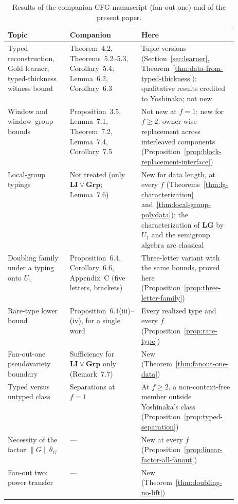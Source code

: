 \begin{table}[htbp]
\caption{Results of the companion CFG manuscript \cite{kuriyamaCFG}
(fan-out one) and of the present paper.}
\label{tab:companion-overlap}
\centering
\footnotesize
\setlength{\tabcolsep}{3pt}
\renewcommand{\arraystretch}{1.15}
\begin{tabularx}{\linewidth}{@{}>{\raggedright\arraybackslash}p{0.27\linewidth}>{\raggedright\arraybackslash}p{0.25\linewidth}>{\raggedright\arraybackslash}X@{}}
\hline
Topic & Companion \cite{kuriyamaCFG} & Here\\
\hline
Typed reconstruction, Gold learner, typed-thickness witness bound
 & Theorem~4.2, Theorems~5.2--5.3, Corollary~5.4; Lemma~6.2, Corollary~6.3
 & Tuple versions (Section~\ref{sec:learner},
   Theorem~\ref{thm:data-from-typed-thickness}); qualitative results credited to
   Yoshinaka; not new\\
Window and window--group bounds
 & Proposition~3.5, Lemma~7.1, Theorem~7.2, Lemma~7.4, Corollary~7.5
 & Not new at $f=1$; new for $f\ge2$: owner-wise replacement across interleaved
   components (Proposition~\ref{prop:block-replacement-interface})\\
Local-group typings
 & Not treated (only $\mathbf{LI}\vee\mathbf{Grp}$; Lemma~7.6)
 & New for data length, at every $f$ (Theorems~\ref{thm:lg-characterization}
   and~\ref{thm:local-group-polydata}); the characterization of $\mathbf{LG}$ by
   $U_1$ and the semigroup algebra are classical \cite{AlmeidaEtAl2009}\\
Doubling family under a typing onto $U_1$
 & Proposition~6.4, Corollary~6.6, Appendix~C (five letters, brackets)
 & Three-letter variant with the same bounds, proved here
   (Proposition~\ref{prop:three-letter-family})\\
Rare-type lower bound
 & Proposition~6.4(iii)--(iv), for a single word
 & Every realized type and every $f$ (Proposition~\ref{prop:rare-type})\\
Fan-out-one pseudovariety boundary
 & Sufficiency for $\mathbf{LI}\vee\mathbf{Grp}$ only (Remark~7.7)
 & New (Theorem~\ref{thm:fanout-one-data})\\
Typed versus untyped class
 & Separations at $f=1$
 & At $f\ge2$, a non-context-free member outside Yoshinaka's class
   (Proposition~\ref{prop:typed-separation})\\
Necessity of the factor $\|G\|\bar\theta_G$
 & ---
 & New at every $f$ (Proposition~\ref{prop:linear-factor-all-fanout})\\
Fan-out two: power transfer
 & ---
 & New (Theorem~\ref{thm:doubling-no-lift})\\
\hline
\end{tabularx}
\end{table}

